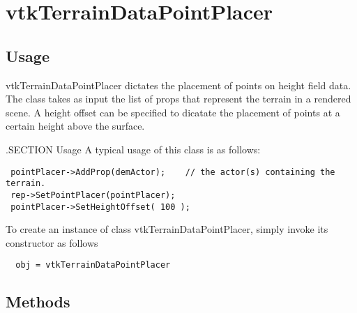 \section{vtkTerrainDataPointPlacer}

\subsection{Usage}

 vtkTerrainDataPointPlacer dictates the placement of points on height field 
 data. The class takes as input the list of props that represent the terrain
 in a rendered scene. A height offset can be specified to dicatate the 
 placement of points at a certain height above the surface. 

 .SECTION Usage
 A typical usage of this class is as follows:
 \begin{verbatim}
 pointPlacer->AddProp(demActor);    // the actor(s) containing the terrain.
 rep->SetPointPlacer(pointPlacer);
 pointPlacer->SetHeightOffset( 100 );
 \end{verbatim}


To create an instance of class vtkTerrainDataPointPlacer, simply
invoke its constructor as follows
\begin{verbatim}
  obj = vtkTerrainDataPointPlacer
\end{verbatim}
\subsection{Methods}


